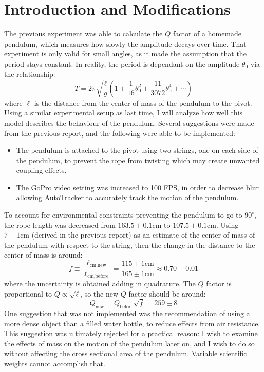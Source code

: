 \documentclass[%
 reprint,
 amsmath,amssymb
 aps,
]{revtex4-2}
\begin{document}
\section{Introduction and Modifications}
The previous experiment was able to calculate the $Q$ factor of a homemade pendulum, which measures how slowly the amplitude decays over time. That experiment is only valid for small angles, as it made the assumption that the period stays constant. In reality, the period is dependant on the amplitude $\theta_0$ via the relationship:\cite{doi:10.1119/1.1457310} %
\begin{equation}
    T = 2\pi\sqrt{\frac{\ell}{g}}\left(1+\frac{1}{16}\theta_0^2+\frac{11}{3072}\theta_0^4+\cdots\right)
    \label{eq:correct-model}
\end{equation}
where $\ell$ is the distance from the center of mass of the pendulum to the pivot. Using a similar experimental setup as last time, I will analyze how well this model describes the behaviour of the pendulum. Several suggestions were made from the previous report, and the following were able to be implemented:
\begin{itemize}
    \item The pendulum is attached to the pivot using two strings, one on each side of the pendulum, to prevent the rope from twisting which may create unwanted coupling effects.
    \item The GoPro video setting was increased to 100 FPS, in order to decrease blur allowing AutoTracker to accurately track the motion of the pendulum.
\end{itemize} 
To account for environmental constraints preventing the pendulum to go to $90^\circ$, the rope length was decreased from $163.5 \pm 0.1\si{\centi\meter}$ to $107.5 \pm 0.1\si{\centi\meter}$. Using $7\pm 1\si{\centi\meter}$ (derived in the previous report) as an estimate of the center of mass of the pendulum with respect to the string, then the change in the distance to the center of mass is around:
\begin{equation}
    f\equiv \frac{\ell_\text{cm,new}}{\ell_\text{cm,before}}=\frac{115\pm 1\si{\centi\meter}}{165\pm 1\si{\centi\meter}} \approx 0.70 \pm 0.01
    \label{eq:}
\end{equation}
where the uncertainty is obtained adding in quadrature. The $Q$ factor is proportional to $Q \propto \sqrt{\ell}$, so the new $Q$ factor should be around:
\begin{equation}
    Q_\text{new} = Q_\text{before}\sqrt{f} = 259 \pm 8
    \label{eq:}
\end{equation}
One suggestion that was not implemented was the recommendation of using a more dense object than a filled water bottle, to reduce effects from air resistance. This suggestion was ultimately rejected for a practical reason: I wish to examine the effects of mass on the motion of the pendulum later on, and I wish to do so without affecting the cross sectional area of the pendulum. Variable scientific weights cannot accomplish that.
\end{document}
